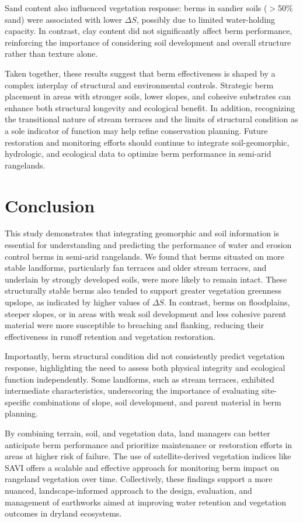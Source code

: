 \documentclass[review]{elsarticle}
\begin{document}
Sand content also influenced vegetation response: berms in sandier soils ($>$50\% sand) were associated with lower $\Delta S$, possibly due to limited water-holding capacity. In contrast, clay content did not significantly affect berm performance, reinforcing the importance of considering soil development and overall structure rather than texture alone.

Taken together, these results suggest that berm effectiveness is shaped by a complex interplay of structural and environmental controls. Strategic berm placement in areas with stronger soils, lower slopes, and cohesive substrates can enhance both structural longevity and ecological benefit. In addition, recognizing the transitional nature of stream terraces and the limits of structural condition as a sole indicator of function may help refine conservation planning. Future restoration and monitoring efforts should continue to integrate soil-geomorphic, hydrologic, and ecological data to optimize berm performance in semi-arid rangelands.

\section{Conclusion}

This study demonstrates that integrating geomorphic and soil information is essential for understanding and predicting the performance of water and erosion control berms in semi-arid rangelands. We found that berms situated on more stable landforms, particularly fan terraces and older stream terraces, and underlain by strongly developed soils, were more likely to remain intact. These structurally stable berms also tended to support greater vegetation greenness upslope, as indicated by higher values of $\Delta S$. In contrast, berms on floodplains, steeper slopes, or in areas with weak soil development and less cohesive parent material were more susceptible to breaching and flanking, reducing their effectiveness in runoff retention and vegetation restoration.

Importantly, berm structural condition did not consistently predict vegetation response, highlighting the need to assess both physical integrity and ecological function independently. Some landforms, such as stream terraces, exhibited intermediate characteristics, underscoring the importance of evaluating site-specific combinations of slope, soil development, and parent material in berm planning.

By combining terrain, soil, and vegetation data, land managers can better anticipate berm performance and prioritize maintenance or restoration efforts in areas at higher risk of failure. The use of satellite-derived vegetation indices like SAVI offers a scalable and effective approach for monitoring berm impact on rangeland vegetation over time. Collectively, these findings support a more nuanced, landscape-informed approach to the design, evaluation, and management of earthworks aimed at improving water retention and vegetation outcomes in dryland ecosystems.
\end{document}
